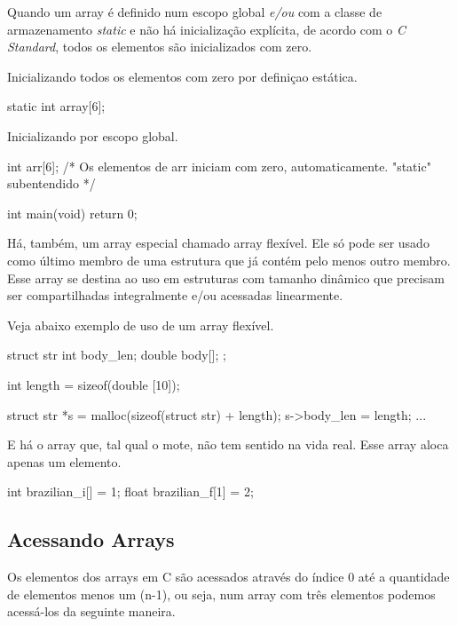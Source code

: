 Quando um array é definido num escopo global \textit{e/ou} com a classe de
armazenamento \textit{static} e não há inicialização explícita, de acordo com o
\textit{C Standard}, todos os elementos são inicializados com zero.

Inicializando todos os elementos com zero por definiçao estática.

\begin{ccode}
  static int array[6];
\end{ccode}

Inicializando por escopo global.

\begin{ccode}
  int arr[6];  /* Os elementos de arr iniciam
                  com zero, automaticamente.
                  "static" subentendido */

  int main(void)
  {
    return 0;
  }
\end{ccode}

Há, também, um array especial chamado array flexível. Ele só pode ser usado
como último membro de uma estrutura que já contém pelo menos outro membro. Esse
array se destina ao uso em estruturas com tamanho dinâmico que precisam ser
compartilhadas integralmente e/ou acessadas linearmente.

Veja abaixo exemplo de uso de um array flexível.

\begin{ccode}
  struct str {
    int body_len;
    double body[];
  };

  int length = sizeof(double [10]);

  struct str *s = malloc(sizeof(struct str) + length);
  s->body_len = length;
  ...
\end{ccode}

E há o array  que, tal qual o mote, não
tem sentido na vida real. Esse array aloca apenas um elemento.

\begin{ccode}
  int brazilian_i[] = {1};
  float brazilian_f[1] = {2};
\end{ccode}

\subsection{Acessando Arrays}
Os elementos dos arrays em C são acessados através do índice 0 até a quantidade
de elementos menos um (n-1), ou seja, num array com três elementos podemos
acessá-los da seguinte maneira.

